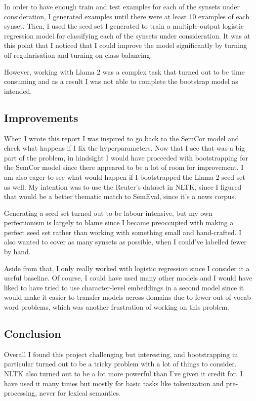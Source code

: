 \documentclass[
10pt, %
a4paper, %
oneside, %
headinclude,footinclude, %
BCOR5mm, %
]{scrartcl}
\begin{document}
In order to have enough train and test examples for each of the synsets under consideration, I generated examples until there were at least 10 examples of each synset. Then, I used the seed set I generated to train a multiple-output logistic regression model for classifying each of the synsets under consideration. It was at this point that I noticed that I could improve the model significantly by turning off regularisation and turning on class balancing.

However, working with Llama 2 was a complex task that turned out to be time consuming and as a result I was not able to complete the bootstrap model as intended.

\subsection{Improvements}

When I wrote this report I was inspired to go back to the SemCor model and check what happens if I fix the hyperparameters. Now that I see that was a big part of the problem, in hindsight I would have proceeded with bootstrapping for the SemCor model since there appeared to be a lot of room for improvement. I am also eager to see what would happen if I bootstrapped the Llama 2 seed set as well. My intention was to use the Reuter's dataset in NLTK, since I figured that would be a better thematic match to SemEval, since it's a news corpus.

Generating a seed set turned out to be labour intensive, but my own perfectionism is largely to blame since I became preoccupied with making a perfect seed set rather than working with something small and hand-crafted. I also wanted to cover as many synsets as possible, when I could've labelled fewer by hand.

Aside from that, I only really worked with logistic regression since I consider it a useful baseline. Of course, I could have used many other models and I would have liked to have tried to use character-level embeddings in a second model since it would make it easier to transfer models across domains due to fewer out of vocab word problems, which was another frustration of working on this problem.

\subsection{Conclusion}

Overall I found this project challenging but interesting, and bootstrapping in particular turned out to be a tricky problem with a lot of things to consider. NLTK also turned out to be a lot more powerful than I've given it credit for. I have used it many times but mostly for basic tasks like tokenization and pre-processing, never for lexical semantics.
\end{document}
